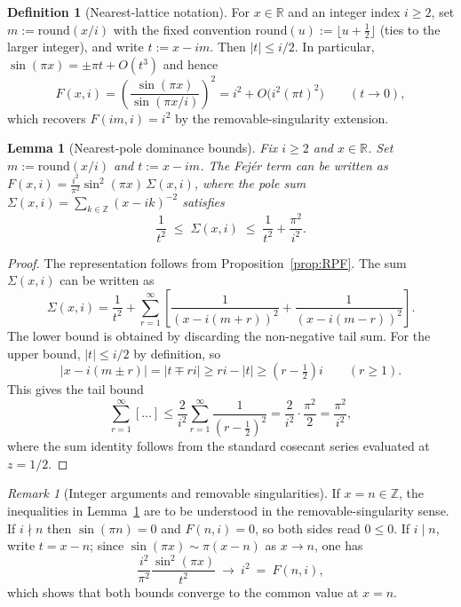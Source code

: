 \documentclass[11pt,a4paper]{amsart}
\theoremstyle{plain}
\newtheorem{lemma}[theorem]{Lemma}
\theoremstyle{definition}
\newtheorem{definition}[theorem]{Definition}
\theoremstyle{remark}
\newtheorem{remark}[theorem]{Remark}
\begin{document}
\begin{definition}[Nearest-lattice notation]\label{def:nearest-lattice}
For $x\in\mathbb{R}$ and an integer index $i\ge2$, set $m:=\mathrm{round}(x/i)$ with the fixed convention $\mathrm{round}(u):=\lfloor u+\tfrac12\rfloor$ (ties to the larger integer), and write $t:=x-im$. Then $|t|\le i/2$. In particular, $\sin(\pi x)=\pm \pi t+O(t^{3})$ and hence
\[
F(x,i)=\left(\frac{\sin(\pi x)}{\sin(\pi x/i)}\right)^{\!2}
=i^{2}+O\!\bigl(i^{2}(\pi t)^{2}\bigr)\qquad(t\to0),
\]
which recovers $F(im,i)=i^{2}$ by the removable-singularity extension.
\end{definition}

\begin{lemma}[Nearest-pole dominance bounds]\label{lem:nearest-pole-bounds}
Fix $i\ge2$ and $x\in\mathbb{R}$. Set $m:=\mathrm{round}(x/i)$ and $t:=x-i m$. The Fej\'er term can be written as $F(x,i) = \frac{i^2}{\pi^2}\sin^2(\pi x)\,\Sigma(x,i)$, where the pole sum $\Sigma(x,i) = \sum_{k\in\mathbb{Z}}(x-i k)^{-2}$ satisfies
\[
\frac{1}{t^2} \;\le\; \Sigma(x,i) \;\le\; \frac{1}{t^2} + \frac{\pi^2}{i^2}.
\]
\end{lemma}

\begin{proof}
The representation follows from Proposition~\ref{prop:RPF}. The sum $\Sigma(x,i)$ can be written as
\[
\Sigma(x,i) = \frac{1}{t^2}+\sum_{r=1}^{\infty}\left[\frac{1}{(x-i(m+r))^{2}}+\frac{1}{(x-i(m-r))^{2}}\right].
\]
The lower bound is obtained by discarding the non-negative tail sum. For the upper bound, $|t|\le i/2$ by definition, so
\[
|x-i(m\pm r)| = |t\mp ri| \ge ri - |t| \ge (r-\tfrac12)i\qquad(r\ge1).
\]
This gives the tail bound
\[
\sum_{r=1}^{\infty}\left[\dots\right] \le \frac{2}{i^2}\sum_{r=1}^{\infty}\frac{1}{(r-\tfrac12)^2} = \frac{2}{i^2}\cdot\frac{\pi^2}{2} = \frac{\pi^2}{i^2},
\]
where the sum identity follows from the standard cosecant series evaluated at $z=1/2$.
\end{proof}

\begin{remark}[Integer arguments and removable singularities]
If $x=n\in\mathbb{Z}$, the inequalities in Lemma~\ref{lem:nearest-pole-bounds} are to be understood in the removable-singularity sense. If $i\nmid n$ then $\sin(\pi n)=0$ and $F(n,i)=0$, so both sides read $0\le 0$. If $i\mid n$, write $t=x-n$; since $\sin(\pi x)\sim \pi(x-n)$ as $x\to n$, one has
\[
\frac{i^{2}}{\pi^{2}}\frac{\sin^{2}(\pi x)}{t^{2}}\ \longrightarrow\ i^{2}\ =\ F(n,i),
\]
which shows that both bounds converge to the common value at $x=n$.
\end{remark}
\end{document}
